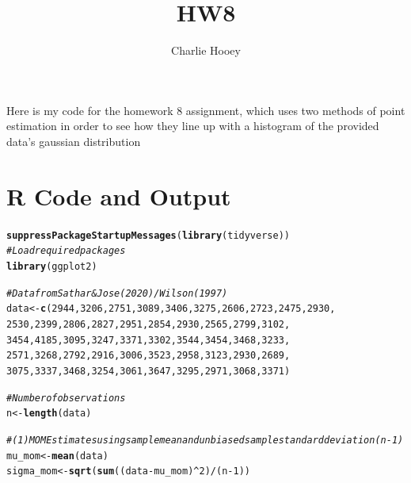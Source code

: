 \documentclass{article}\usepackage[]{graphicx}\usepackage[]{xcolor}
\makeatletter
\newcommand{\hlnum}[1]{\textcolor[rgb]{0.686,0.059,0.569}{#1}}%
\newcommand{\hlcom}[1]{\textcolor[rgb]{0.678,0.584,0.686}{\textit{#1}}}%
\newcommand{\hlopt}[1]{\textcolor[rgb]{0,0,0}{#1}}%
\newcommand{\hldef}[1]{\textcolor[rgb]{0.345,0.345,0.345}{#1}}%
\newcommand{\hlkwb}[1]{\textcolor[rgb]{0.69,0.353,0.396}{#1}}%
\newcommand{\hlkwd}[1]{\textcolor[rgb]{0.737,0.353,0.396}{\textbf{#1}}}%
\newenvironment{kframe}{%
 \def\at@end@of@kframe{}%
 \ifinner\ifhmode%
  \def\at@end@of@kframe{\end{minipage}}%
  \begin{minipage}{\columnwidth}%
 \fi\fi%
 \def\FrameCommand##1{\hskip\@totalleftmargin \hskip-\fboxsep
 \colorbox{shadecolor}{##1}\hskip-\fboxsep
     \hskip-\linewidth \hskip-\@totalleftmargin \hskip\columnwidth}%
 \MakeFramed {\advance\hsize-\width
   \@totalleftmargin\z@ \linewidth\hsize
   \@setminipage}}%
 {\par\unskip\endMakeFramed%
 \at@end@of@kframe}
\newenvironment{knitrout}{}{} %
\makeatother
\begin{document}
\title{HW8}
\author{Charlie Hooey}



Here is my code for the homework 8 assignment, which uses two methods of point estimation in order to see how they line up with a histogram of the provided data's gaussian distribution

\section{R Code and Output}
\begin{knitrout}\scriptsize
{}\color{fgcolor}\begin{kframe}
\begin{alltt}
\hlkwd{suppressPackageStartupMessages}\hldef{(}\hlkwd{library}\hldef{(tidyverse))}
\hlcom{# Load required packages}
\hlkwd{library}\hldef{(ggplot2)}

\hlcom{# Data from Sathar & Jose (2020) / Wilson (1997)}
\hldef{data} \hlkwb{<-} \hlkwd{c}\hldef{(}\hlnum{2944}\hldef{,} \hlnum{3206}\hldef{,} \hlnum{2751}\hldef{,} \hlnum{3089}\hldef{,} \hlnum{3406}\hldef{,} \hlnum{3275}\hldef{,} \hlnum{2606}\hldef{,} \hlnum{2723}\hldef{,} \hlnum{2475}\hldef{,} \hlnum{2930}\hldef{,}
          \hlnum{2530}\hldef{,} \hlnum{2399}\hldef{,} \hlnum{2806}\hldef{,} \hlnum{2827}\hldef{,} \hlnum{2951}\hldef{,} \hlnum{2854}\hldef{,} \hlnum{2930}\hldef{,} \hlnum{2565}\hldef{,} \hlnum{2799}\hldef{,} \hlnum{3102}\hldef{,}
          \hlnum{3454}\hldef{,} \hlnum{4185}\hldef{,} \hlnum{3095}\hldef{,} \hlnum{3247}\hldef{,} \hlnum{3371}\hldef{,} \hlnum{3302}\hldef{,} \hlnum{3544}\hldef{,} \hlnum{3454}\hldef{,} \hlnum{3468}\hldef{,} \hlnum{3233}\hldef{,}
          \hlnum{2571}\hldef{,} \hlnum{3268}\hldef{,} \hlnum{2792}\hldef{,} \hlnum{2916}\hldef{,} \hlnum{3006}\hldef{,} \hlnum{3523}\hldef{,} \hlnum{2958}\hldef{,} \hlnum{3123}\hldef{,} \hlnum{2930}\hldef{,} \hlnum{2689}\hldef{,}
          \hlnum{3075}\hldef{,} \hlnum{3337}\hldef{,} \hlnum{3468}\hldef{,} \hlnum{3254}\hldef{,} \hlnum{3061}\hldef{,} \hlnum{3647}\hldef{,} \hlnum{3295}\hldef{,} \hlnum{2971}\hldef{,} \hlnum{3068}\hldef{,} \hlnum{3371}\hldef{)}

\hlcom{# Number of observations}
\hldef{n} \hlkwb{<-} \hlkwd{length}\hldef{(data)}

\hlcom{# (1) MOM Estimates using sample mean and unbiased sample standard deviation (n-1)}
\hldef{mu_mom} \hlkwb{<-} \hlkwd{mean}\hldef{(data)}
\hldef{sigma_mom} \hlkwb{<-} \hlkwd{sqrt}\hldef{(}\hlkwd{sum}\hldef{((data} \hlopt{-} \hldef{mu_mom)}\hlopt{^}\hlnum{2}\hldef{)} \hlopt{/} \hldef{(n} \hlopt{-} \hlnum{1}\hldef{))}


\end{alltt}
\end{kframe}
\end{knitrout}
\end{document}
